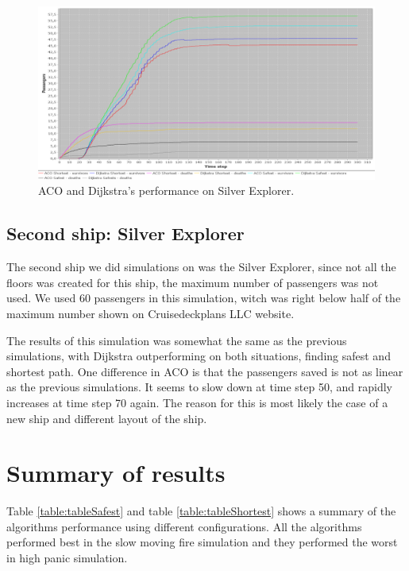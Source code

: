 \begin{figure} [h]
\centering
\hspace*{-1.0in}
\includegraphics[scale=0.35]{images/Graph-ship-two-60-passangers-200-rounds.png}
\caption{ACO and Dijkstra's performance on Silver Explorer.}
\label{fig:silverExplor}
\end{figure}

\subsection{Second ship: Silver Explorer}
The second ship we did simulations on was the Silver Explorer, since not all the floors was created for this ship, the maximum number of passengers was not used. We used 60 passengers in this simulation, witch was right below half of the maximum number shown on Cruisedeckplans LLC website\cite{cruseships}.

The results of this simulation was somewhat the same as the previous simulations, with Dijkstra outperforming on both situations, finding safest and shortest path. One difference in ACO is that the passengers saved is not as linear as the previous simulations. It seems to slow down at time step 50, and rapidly increases at time step 70 again. The reason for this is most likely the case of a new ship and different layout of the ship.

\section{Summary of results}

Table \ref{table:tableSafest} and table \ref{table:tableShortest} shows a summary of the algorithms performance using different configurations. All the algorithms performed best in the slow moving fire simulation and they performed the worst in high panic simulation.

